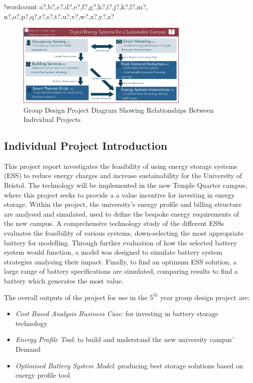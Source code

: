 \documentclass[fontsize=9.5pt]{extarticle}
\numberwithin{figure}{section} %
\providecommand{\tightlist}{%
  \setlength{\itemsep}{0pt}\setlength{\parskip}{0pt}}
\newcounter{words}
\newenvironment{counted}{%
  \setcounter{words}{0}
  \SearchList!{wordcount}{\stepcounter{words}}
    {a?,b?,c?,d?,e?,f?,g?,h?,i?,j?,k?,l?,m?,
    n?,o?,p?,q?,r?,s?,t?,u?,v?,w?,x?,y?,z?}
  \UndoBoundary{'}
  \SearchOrder{p;}}{%
  \StopSearching}
\begin{document}
\begin{counted}
\begin{figure}[H]
\centering
\vspace{-5pt}
\includegraphics[width=0.75\textwidth]{GroupDiav2.eps}
\caption{Group Design Project Diagram Showing Relationships Between Individual Projects}
\vspace{-20pt}
\label{groupDia}
\end{figure}

\subsection{Individual Project
Introduction}\label{individual-project-introduction}

This project report investigates the feasibility of using energy storage
systems (ESS) to reduce energy charges and increase sustainability for
the University of Bristol. The technology will be implemented in the new
Temple Quarter campus, where this project seeks to provide a a value
incentive for investing in energy storage. Within the project, the
university's energy profile and billing structure are analysed and
simulated, used to define the bespoke energy requirements of the new
campus. A comprehensive technology study of the different ESSs evaluates
the feasibility of various systems, down-selecting the most appropriate
battery for modelling. Through further evaluation of how the selected
battery system would function, a model was designed to simulate battery
system strategies analysing their impact. Finally, to find an optimum
ESS solution, a large range of battery specifications are simulated,
comparing results to find a battery which generates the most value.

The overall outputs of the project for use in the \(5^{th}\) year group
design project are:

\begin{itemize}
\tightlist
\item
  \emph{Cost Based Analysis Business Case}: for investing in battery
  storage technology
\item
  \emph{Energy Profile Tool}: to build and understand the new university
  campus' Demand
\item
  \emph{Optimised Battery System Model}: producing best storage
  solutions based on energy profile tool
\end{itemize}


\end{counted}
\end{document}
